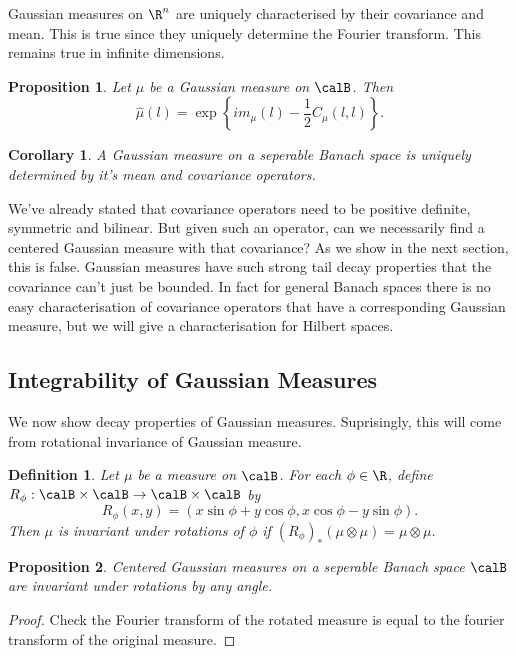 \documentclass[fontsize=12pt, DIV=10]{scrreprt}
\theoremstyle{mydefn}
\newtheorem{defn}{Definition}
\newtheorem{prop}{Proposition}
\newtheorem{corollary}{Corollary}
\theoremstyle{remark}
\begin{document}
Gaussian measures on $\R^n$ are uniquely characterised by their covariance and mean. This is true since they uniquely determine the Fourier transform. This remains true in infinite dimensions.
\begin{prop}
	Let $\mu$ be a Gaussian measure on $\calB$. Then
	\begin{equation}
		\hat{\mu}(l) = \exp\left\{i m_{\mu}(l) - \frac{1}{2} C_{\mu}(l, l) \right\}.
	\end{equation}
\end{prop}
\begin{corollary}
	A Gaussian measure on a seperable Banach space is uniquely determined by it's mean and covariance operators.
\end{corollary}
We've already stated that covariance operators need to be positive definite, symmetric and bilinear. But given such an operator, can we necessarily find a centered Gaussian measure with that covariance? As we show in the next section, this is false. Gaussian measures have such strong tail decay properties that the covariance can't just be bounded. In fact for general Banach spaces there is no easy characterisation of covariance operators that have a corresponding Gaussian measure, but we will give a characterisation for Hilbert spaces.

\subsection{Integrability of Gaussian Measures}

We now show decay properties of Gaussian measures. Suprisingly, this will come from rotational invariance of Gaussian measure. 

\begin{defn}
	Let $\mu$ be a measure on $\calB$. For each $\phi \in \R$, define $R_{\phi}: \calB \times \calB \to \calB \times \calB$ by
	\begin{equation}
		R_{\phi}(x, y) = (x \sin \phi + y \cos \phi, x \cos \phi - y \sin \phi).
	\end{equation}
	Then $\mu$ is \emph{invariant under rotations of $\phi$} if $(R_{\phi})_* (\mu \otimes \mu) = \mu \otimes \mu$.
\end{defn}

\begin{prop}
	Centered Gaussian measures on a seperable Banach space $\calB$ are invariant under rotations by any angle.
\end{prop}
\begin{proof}
	Check the Fourier transform of the rotated measure is equal to the fourier transform of the original measure.
\end{proof}
\end{document}
